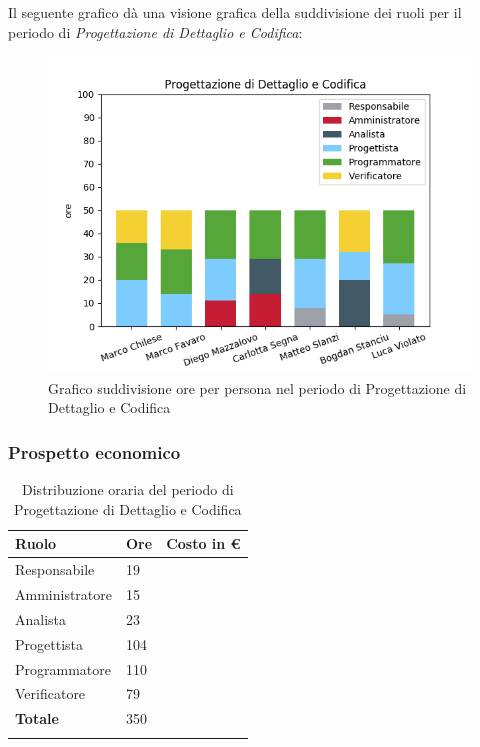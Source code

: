 Il seguente grafico dà una visione grafica della suddivisione dei ruoli per il periodo di \textit{Progettazione di Dettaglio e Codifica}:

\begin{figure}[H]
	\centering
	\includegraphics[width=1\linewidth]{./images/fig_pdc.png}
	\caption{Grafico suddivisione ore per persona nel periodo di Progettazione di Dettaglio e Codifica}
	\label{fig:grafico suddivione ruoli periodo pdc}
\end{figure}

\subsubsection{Prospetto economico}
\begin{longtable}{| C{.30\textwidth}| C{.15\textwidth}| C{.20\textwidth}|}
	\hline
	\textbf{Ruolo} & \textbf{Ore} & \textbf{Costo in \euro} \\
	\hline 
	Responsabile & 19 &  \\
	\hline
	Amministratore & 15 & \\
	\hline
	Analista & 23 &  \\
	\hline
	Progettista & 104 &  \\
	\hline
	Programmatore & 110 &  \\
	\hline
	Verificatore & 79 &  \\
	\hline
	\textbf{Totale} & 350 & \\ 
	\hline
	
	\caption{Distribuzione oraria del periodo di Progettazione di Dettaglio e Codifica}
	\label{Distribuzione oraria pdc}
\end{longtable}

